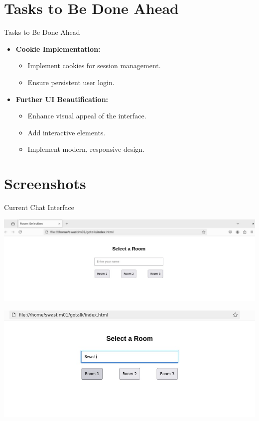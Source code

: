 \documentclass{beamer}
\begin{document}
\section{Tasks to Be Done Ahead}

\begin{frame}{Tasks to Be Done Ahead}
    \begin{itemize}
        \item \textbf{Cookie Implementation:}
        \begin{itemize}
            \item Implement cookies for session management.
            \item Ensure persistent user login.
        \end{itemize}
        \item \textbf{Further UI Beautification:}
        \begin{itemize}
            \item Enhance visual appeal of the interface.
            \item Add interactive elements.
            \item Implement modern, responsive design.
        \end{itemize}
    \end{itemize}
\end{frame}

\section{Screenshots}
\begin{frame}{Current Chat Interface}
        \begin{minipage}[t]{0.5\textwidth}
            \centering
            \includegraphics[width=\textwidth]{Pictures/room created.jpg}
        \end{minipage}
        \hfill
        \begin{minipage}[t]{0.5\textwidth}
            \centering
            \includegraphics[width=\textwidth]{Pictures/nameinsertion.jpg}
        \end{minipage}
\end{frame}
\end{document}
